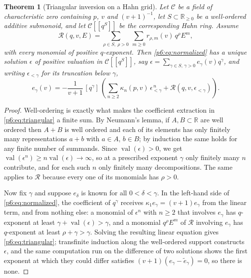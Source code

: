 \documentclass[11pt,a4paper,oneside]{book}
\theoremstyle{plain}
\newtheorem{theorem}{Theorem}[chapter]
\theoremstyle{definition}
\theoremstyle{remark}
\newcommand{\Real}{\mathbb{R}}
\newcommand{\Coef}[1]{[#1]\,}
\begin{document}
\begin{theorem}[Triangular inversion on a Hahn grid]
\label{p6:thm:triangular}
Let $\mathscr C$ be a field of characteristic zero containing $p$, $v$ and
$(v+1)^{-1}$, let $S\subset\Real_{\ge0}$ be a \emph{well-ordered} additive
submonoid, and let $\mathscr C[[q^{S}]]$ be the corresponding Hahn ring.
Assume
\begin{equation}\label{p6:eq:R-shape}
 \mathcal{R}(q,v,E)=\sum_{\rho\in S,\ \rho>0}\ \sum_{m\ge0}
 r_{\rho,m}(v)\,q^{\rho}E^{m},
\end{equation}
with every monomial of positive $q$-exponent.  Then \eqref{p6:eq:normalized}
has a unique solution $\epsilon$ of positive valuation in
$\mathscr C[[q^{S}]]$, say
$\epsilon=\sum_{\gamma\in S,\,\gamma>0}e_\gamma(v)q^{\gamma}$, and writing
$\epsilon_{<\gamma}$ for its truncation below $\gamma$,
\begin{equation}\label{p6:eq:triangular}
 e_{\gamma}(v)=-\frac1{v+1}\,\Coef{q^{\gamma}}
 \left(\sum_{n\ge2}\kappa_n(p,v)\,\epsilon_{<\gamma}^{\,n}
 +\mathcal{R}(q,v,\epsilon_{<\gamma})\right).
\end{equation}
\end{theorem}

\begin{proof}
Well-ordering is exactly what makes the coefficient extraction in
\eqref{p6:eq:triangular} a finite sum.  By Neumann's lemma, if $A,B\subset
\Real$ are well ordered then $A+B$ is well ordered and each of its elements
has only finitely many representations $a+b$ with $a\in A$, $b\in B$; by
induction the same holds for any finite number of summands.  Since
$\operatorname{val}(\epsilon)>0$, we get
$\operatorname{val}(\epsilon^{n})\ge n\operatorname{val}(\epsilon)\to\infty$,
so at a prescribed exponent $\gamma$ only finitely many $n$ contribute, and
for each such $n$ only finitely many decompositions.  The same applies to
$\mathcal{R}$ because every one of its monomials has $\rho>0$.

Now fix $\gamma$ and suppose $e_\delta$ is known for all $0<\delta<\gamma$.
In the left-hand side of \eqref{p6:eq:normalized}, the coefficient of
$q^{\gamma}$ receives $\kappa_1e_\gamma=(v+1)e_\gamma$ from the linear term,
and from nothing else: a monomial of $\epsilon^{n}$ with $n\ge2$ that involves
$e_\gamma$ has $q$-exponent at least $\gamma+\operatorname{val}(\epsilon)>
\gamma$, and a monomial $q^{\rho}E^{m}$ of $\mathcal{R}$ involving $e_\gamma$ has
$q$-exponent at least $\rho+\gamma>\gamma$.  Solving the resulting linear
equation gives \eqref{p6:eq:triangular}; transfinite induction along the
well-ordered support constructs $\epsilon$, and the same computation run on
the difference of two solutions shows the first exponent at which they could
differ satisfies $(v+1)(e_\gamma-\widetilde e_\gamma)=0$, so there is none.
\end{proof}
\end{document}
